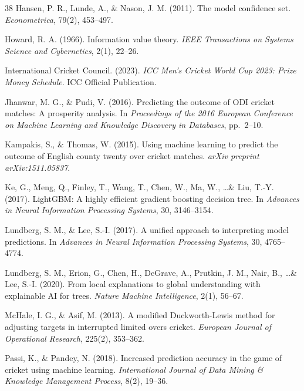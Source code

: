 \documentclass[10pt,a4paper,twocolumn]{article}
\begin{document}
\begin{thebibliography}{38}
Hansen, P. R., Lunde, A., \& Nason, J. M. (2011).
\newblock The model confidence set.
\newblock \textit{Econometrica}, 79(2), 453--497.

Howard, R. A. (1966).
\newblock Information value theory.
\newblock \textit{IEEE Transactions on Systems Science and Cybernetics}, 2(1), 22--26.

International Cricket Council. (2023).
\newblock \textit{ICC Men's Cricket World Cup 2023: Prize Money Schedule}.
\newblock ICC Official Publication.

Jhanwar, M. G., \& Pudi, V. (2016).
\newblock Predicting the outcome of ODI cricket matches: A prosperity analysis.
\newblock In \textit{Proceedings of the 2016 European Conference on Machine Learning and Knowledge Discovery in Databases}, pp.\ 2--10.

Kampakis, S., \& Thomas, W. (2015).
\newblock Using machine learning to predict the outcome of English county twenty over cricket matches.
\newblock \textit{arXiv preprint arXiv:1511.05837}.

Ke, G., Meng, Q., Finley, T., Wang, T., Chen, W., Ma, W., \ldots \& Liu, T.-Y. (2017).
\newblock LightGBM: A highly efficient gradient boosting decision tree.
\newblock In \textit{Advances in Neural Information Processing Systems}, 30, 3146--3154.

Lundberg, S. M., \& Lee, S.-I. (2017).
\newblock A unified approach to interpreting model predictions.
\newblock In \textit{Advances in Neural Information Processing Systems}, 30, 4765--4774.

Lundberg, S. M., Erion, G., Chen, H., DeGrave, A., Prutkin, J. M., Nair, B., \ldots \& Lee, S.-I. (2020).
\newblock From local explanations to global understanding with explainable AI for trees.
\newblock \textit{Nature Machine Intelligence}, 2(1), 56--67.

McHale, I. G., \& Asif, M. (2013).
\newblock A modified Duckworth-Lewis method for adjusting targets in interrupted limited overs cricket.
\newblock \textit{European Journal of Operational Research}, 225(2), 353--362.

Passi, K., \& Pandey, N. (2018).
\newblock Increased prediction accuracy in the game of cricket using machine learning.
\newblock \textit{International Journal of Data Mining \& Knowledge Management Process}, 8(2), 19--36.


\end{thebibliography}
\end{document}
